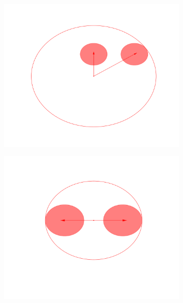 \documentclass[12pt, oneside]{report}
\begin{document}
\begin{figure}
  \centering

  \begin{subfigure}[b]{0.4\linewidth}
    \includegraphics[width=\linewidth,height=\linewidth]{Images/Auxillaries/unoptimised_fig.pdf}
    \caption{}
  \end{subfigure}
  \begin{subfigure}[b]{0.4\linewidth}
    \includegraphics[width=\linewidth,height=\linewidth]{Images/Auxillaries/optimised_fig.pdf}
    \caption{}
  \end{subfigure}



\end{figure}
\end{document}
